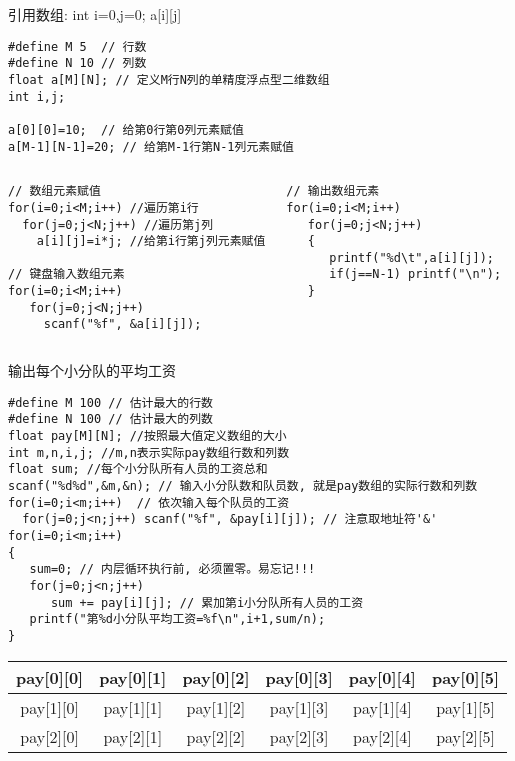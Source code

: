 \begin{frame}{引用数组: int i=0,j=0; a[i][j]}
\begin{lstlisting}
#define M 5  // 行数
#define N 10 // 列数
float a[M][N]; // 定义M行N列的单精度浮点型二维数组
int i,j;

a[0][0]=10;  // 给第0行第0列元素赋值
a[M-1][N-1]=20; // 给第M-1行第N-1列元素赋值
\end{lstlisting}
\begin{columns}[T]
\begin{lstlisting}
// 数组元素赋值
for(i=0;i<M;i++) //遍历第i行
  for(j=0;j<N;j++) //遍历第j列 
    a[i][j]=i*j; //给第i行第j列元素赋值
    
// 键盘输入数组元素
for(i=0;i<M;i++)
   for(j=0;j<N;j++)
     scanf("%f", &a[i][j]);
\end{lstlisting}
\begin{lstlisting}
// 输出数组元素
for(i=0;i<M;i++)
   for(j=0;j<N;j++)
   {
      printf("%d\t",a[i][j]);
      if(j==N-1) printf("\n");
   }
\end{lstlisting}
\end{columns}
\vspace{0.2cm}
\end{frame}

\begin{frame}{输出每个小分队的平均工资}
\begin{lstlisting}
#define M 100 // 估计最大的行数
#define N 100 // 估计最大的列数
float pay[M][N]; //按照最大值定义数组的大小
int m,n,i,j; //m,n表示实际pay数组行数和列数
float sum; //每个小分队所有人员的工资总和
scanf("%d%d",&m,&n); // 输入小分队数和队员数, 就是pay数组的实际行数和列数
for(i=0;i<m;i++)  // 依次输入每个队员的工资
  for(j=0;j<n;j++) scanf("%f", &pay[i][j]); // 注意取地址符'&'
for(i=0;i<m;i++)
{
   sum=0; // 内层循环执行前, 必须置零。易忘记!!!
   for(j=0;j<n;j++)
      sum += pay[i][j]; // 累加第i小分队所有人员的工资
   printf("第%d小分队平均工资=%f\n",i+1,sum/n);
}
\end{lstlisting}
\tiny
\begin{tabular}{|c|c|c|c|c|c|}
	\hline  
	pay[0][0] & pay[0][1] & pay[0][2] & pay[0][3] & pay[0][4] & pay[0][5] \\ 
	\hline 
	pay[1][0] & pay[1][1] & pay[1][2] & pay[1][3] & pay[1][4] & pay[1][5] \\ 
	\hline 
	pay[2][0] & pay[2][1] & pay[2][2] & pay[2][3] & pay[2][4] & pay[2][5] \\ 
	\hline 
\end{tabular}
\vspace{0.01cm}
\end{frame}

